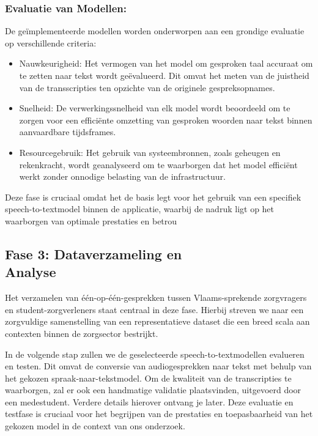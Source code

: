 \subsubsection{Evaluatie van Modellen:}
De geïmplementeerde modellen worden onderworpen aan een grondige evaluatie op verschillende criteria:
\begin{itemize}
\item Nauwkeurigheid: Het vermogen van het model om gesproken taal accuraat om te zetten naar tekst wordt geëvalueerd. Dit omvat het meten van de juistheid van de transscripties ten opzichte van de originele gespreksopnames.

\item Snelheid: De verwerkingssnelheid van elk model wordt beoordeeld om te zorgen voor een efficiënte omzetting van gesproken woorden naar tekst binnen aanvaardbare tijdsframes.

\item Resourcegebruik: Het gebruik van systeembronnen, zoals geheugen en rekenkracht, wordt geanalyseerd om te waarborgen dat het model efficiënt werkt zonder onnodige belasting van de infrastructuur.
\end{itemize}

Deze fase is cruciaal omdat het de basis legt voor het gebruik van een specifiek speech-to-textmodel binnen de applicatie, waarbij de nadruk ligt op het waarborgen van optimale prestaties en betrou

\subsection{Fase 3: Dataverzameling en \\ Analyse}
Het verzamelen van één-op-één-gesprekken tussen Vlaams-sprekende zorgvragers en student-zorgverleners staat centraal in deze fase. Hierbij streven we naar een zorgvuldige samenstelling van een representatieve dataset die een breed scala aan contexten binnen de zorgsector bestrijkt.

In de volgende stap zullen we de geselecteerde speech-to-textmodellen evalueren en testen. Dit omvat de conversie van audiogesprekken naar tekst met behulp van het gekozen spraak-naar-tekstmodel. Om de kwaliteit van de transcripties te waarborgen, zal er ook een handmatige validatie plaatsvinden, uitgevoerd door een medestudent. Verdere details hierover ontvang je later. Deze evaluatie en testfase is cruciaal voor het begrijpen van de prestaties en toepasbaarheid van het gekozen model in de context van ons onderzoek.


